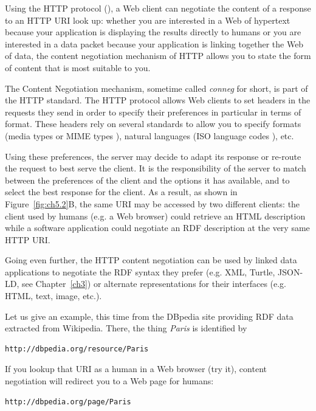 Using the HTTP protocol (\cite{leach1999hypertext}), a Web client
can negotiate the content of a response to an HTTP URI look up: whether
you are interested in a Web of hypertext because your application is
displaying the results directly to humans or you are interested in a data packet 
because your application is linking together the Web of data, 
the content negotiation mechanism of HTTP
allows you to state the form of content that is most suitable to you.

The Content Negotiation mechanism, sometime called \emph{conneg} for short, is part of the
HTTP standard. The HTTP protocol allows Web clients to set headers in
the requests they send in order to specify their preferences in
particular in terms of format. These headers rely on several standards
to allow you to specify formats (media types or MIME types \cite{klensin2013media}), 
natural languages (ISO
language codes \cite{iso_language_639}), etc.

Using these preferences, the server may decide to adapt its response or
re-route the request to best serve the client. It is the responsibility
of the server to match between the preferences of the client and the
options it has available, and to select the best response for the
client. As a result, as shown in Figure~\ref{fig:ch5.2}B,  the same URI may be accessed
by two different clients: the client used by humans (e.g. a Web browser)
could retrieve an HTML description while a software  application could
negotiate an RDF description at the very same HTTP URI.

Going even further, the HTTP content negotiation can be used by linked
data applications to negotiate the RDF syntax they prefer (e.g. XML,
Turtle, JSON-LD, see Chapter~\ref{ch3}) or alternate representations for their interfaces (e.g.
HTML, text, image, etc.).

Let us give an example, this time from the DBpedia site providing RDF
data extracted from Wikipedia. There, the thing \emph{Paris} is identified
by

\begin{lstlisting}
http://dbpedia.org/resource/Paris
\end{lstlisting}

If you lookup that URI as a human in a Web browser (try it), content
negotiation will redirect you to a Web page for humans:

\begin{lstlisting}
http://dbpedia.org/page/Paris
\end{lstlisting}

